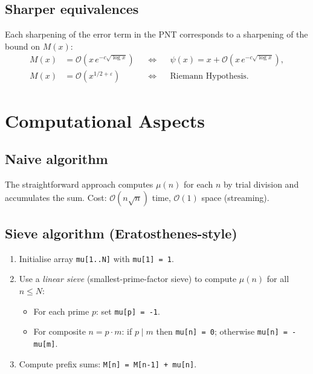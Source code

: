 \documentclass[12pt,a4paper]{amsart}
\theoremstyle{definition}
\newcommand{\BigO}{\mathcal{O}}
\begin{document}
\subsection{Sharper equivalences}

Each sharpening of the error term in the PNT corresponds to a sharpening of
the bound on $M(x)$:
\begin{align*}
  M(x) &= \BigO(x\,e^{-c\sqrt{\log x}}) &&\Longleftrightarrow&&
    \psi(x) = x + \BigO(x\,e^{-c\sqrt{\log x}}), \\
  M(x) &= \BigO(x^{1/2+\varepsilon}) &&\Longleftrightarrow&&
    \text{Riemann Hypothesis.}
\end{align*}

\section{Computational Aspects}
\label{sec:algorithms}

\subsection{Naive algorithm}

The straightforward approach computes $\mu(n)$ for each $n$ by trial division
and accumulates the sum.  Cost: $\BigO(n\sqrt{n})$ time, $\BigO(1)$ space
(streaming).

\subsection{Sieve algorithm (Eratosthenes-style)}

\begin{enumerate}[label=\arabic*.]
  \item Initialise array \texttt{mu[1..N]} with \texttt{mu[1] = 1}.
  \item Use a \emph{linear sieve} (smallest-prime-factor sieve) to compute
        $\mu(n)$ for all $n \le N$:
        \begin{itemize}
          \item For each prime $p$: set \texttt{mu[p] = -1}.
          \item For composite $n = p \cdot m$: if $p \mid m$ then
                \texttt{mu[n] = 0}; otherwise \texttt{mu[n] = -mu[m]}.
        \end{itemize}
  \item Compute prefix sums: \texttt{M[n] = M[n-1] + mu[n]}.
\end{enumerate}
\end{document}
